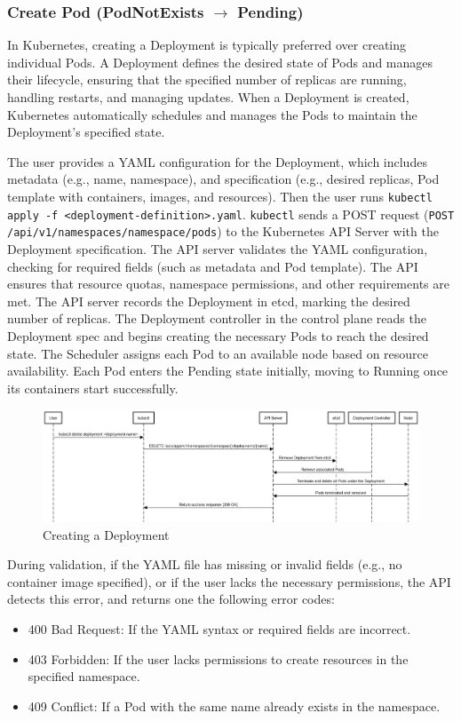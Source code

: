\documentclass[main.tex]{subfiles}
\begin{document}
\subsubsection{Create Pod (PodNotExists $\rightarrow$ Pending)}
In Kubernetes, creating a Deployment is typically preferred over creating individual Pods. A Deployment defines the desired state of Pods and manages their lifecycle, ensuring that the specified number of replicas are running, handling restarts, and managing updates. When a Deployment is created, Kubernetes automatically schedules and manages the Pods to maintain the Deployment's specified state.

The user provides a YAML\cite{yaml} configuration for the Deployment, which includes metadata (e.g., name, namespace), and specification (e.g., desired replicas, Pod template with containers, images, and resources). Then the user runs \texttt{kubectl apply -f <deployment-definition>.yaml}.
\texttt{kubectl} sends a POST request (\texttt{POST /api/v1/namespaces/{namespace}/pods}) to the Kubernetes API Server with the Deployment specification. The API server validates the YAML configuration, checking for required fields (such as metadata and Pod template).
The API ensures that resource quotas, namespace permissions, and other requirements are met. The API server records the Deployment in etcd, marking the desired number of replicas.
The Deployment controller in the control plane reads the Deployment spec and begins creating the necessary Pods to reach the desired state. The Scheduler assigns each Pod to an available node based on resource availability.
Each Pod enters the Pending state initially, moving to Running once its containers start successfully.

\begin{figure}[H]
    \centering
    \includegraphics[width=\textwidth]{../uml_seq_diagrams/create_deployment.png}
    \caption{Creating a Deployment}
    \label{fig:create_deployment_diagram}
\end{figure}

During validation, if the YAML file has missing or invalid fields (e.g., no container image specified), or if the user lacks the necessary permissions, the API detects this error, and returns one the following error codes: 
\begin{itemize}
    \item 400 Bad Request: If the YAML syntax or required fields are incorrect.
    \item 403 Forbidden: If the user lacks permissions to create resources in the specified namespace.
    \item 409 Conflict: If a Pod with the same name already exists in the namespace.
\end{itemize}
\end{document}
